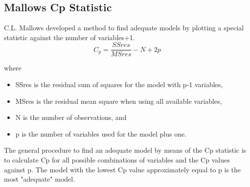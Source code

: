 
\subsection{Mallows Cp Statistic}

C.L. Mallows developed a method to find adequate models by plotting a special 
statistic against the number of variables+1. 
\[ C_p = \frac{SSres}{MSres} - N + 2p \]

where 
\begin{itemize}
\item  SSres is the residual sum of squares for the model with p-1 variables, 
\item  MSres is the residual mean square when using all available variables, 
\item  N is the number of observations, and 
\item  p is the number of variables used for the model plus one. 
\end{itemize}
The general procedure to find an adequate model by means of the Cp statistic is to calculate Cp for all possible combinations of variables and the Cp values against p. The model with the lowest Cp value approximately equal to p is the most "adequate" model. 







